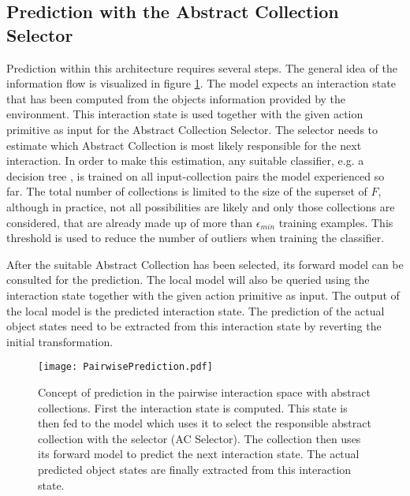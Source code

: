 
\subsection{Prediction with the Abstract Collection Selector}
Prediction within this architecture requires several steps. The general idea of the information flow is visualized in figure \ref{fig:PairPrediction}. The model expects an interaction state that has been computed from the objects information provided by the environment. This interaction state is used together with the given action primitive as input for the Abstract Collection Selector. The selector needs to estimate which Abstract Collection is most likely responsible for the next interaction. In order to make this estimation, any suitable classifier, e.g. a decision tree \cite{DT}, is trained on all input-collection pairs the model experienced so far. 
The total number of collections is limited to the size of the superset of $F$, although in practice, not all possibilities are likely and only those collections are considered, that are already made up of more than $\epsilon_{min}$ training examples. This threshold is used to reduce the number of outliers when training the classifier. %

After the suitable Abstract Collection has been selected, its forward model can be consulted for the prediction. The local model will also be queried using the interaction state together with the given action primitive as input. The output of the local model is the predicted interaction state. The prediction of the actual object states need to be extracted from this interaction state by reverting the initial transformation.

\begin{figure}
	\centering
	\texttt{[image: PairwisePrediction.pdf]}
	\caption{Concept of prediction in the pairwise interaction space with abstract collections. First the interaction state is computed. This state is then fed to the model which uses it to select the responsible abstract collection with the selector (AC Selector). The collection then uses its forward model to predict the next interaction state. The actual predicted object states are finally extracted from this interaction state.} 
	\label{fig:PairPrediction}
\end{figure}

